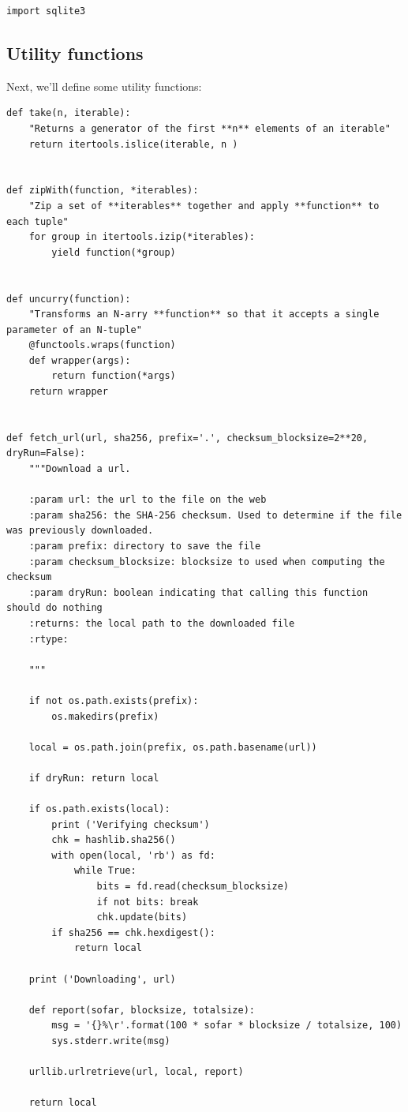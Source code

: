 \begin{verbatim}
import sqlite3
\end{verbatim}

\subsection{Utility functions}\label{utility-functions}

Next, we'll define some utility functions:

\begin{verbatim}
def take(n, iterable):
    "Returns a generator of the first **n** elements of an iterable"
    return itertools.islice(iterable, n )


def zipWith(function, *iterables):
    "Zip a set of **iterables** together and apply **function** to each tuple"
    for group in itertools.izip(*iterables):
        yield function(*group)


def uncurry(function):
    "Transforms an N-arry **function** so that it accepts a single parameter of an N-tuple"
    @functools.wraps(function)
    def wrapper(args):
        return function(*args)
    return wrapper


def fetch_url(url, sha256, prefix='.', checksum_blocksize=2**20, dryRun=False):
    """Download a url.

    :param url: the url to the file on the web
    :param sha256: the SHA-256 checksum. Used to determine if the file was previously downloaded.
    :param prefix: directory to save the file
    :param checksum_blocksize: blocksize to used when computing the checksum
    :param dryRun: boolean indicating that calling this function should do nothing
    :returns: the local path to the downloaded file
    :rtype:

    """

    if not os.path.exists(prefix):
        os.makedirs(prefix)

    local = os.path.join(prefix, os.path.basename(url))

    if dryRun: return local

    if os.path.exists(local):
        print ('Verifying checksum')
        chk = hashlib.sha256()
        with open(local, 'rb') as fd:
            while True:
                bits = fd.read(checksum_blocksize)
                if not bits: break
                chk.update(bits)
        if sha256 == chk.hexdigest():
            return local

    print ('Downloading', url)

    def report(sofar, blocksize, totalsize):
        msg = '{}%\r'.format(100 * sofar * blocksize / totalsize, 100)
        sys.stderr.write(msg)

    urllib.urlretrieve(url, local, report)

    return local
\end{verbatim}

